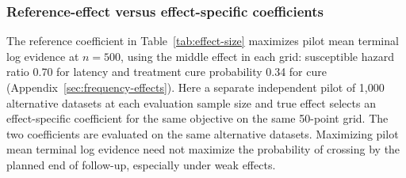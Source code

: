 \documentclass[12pt]{article}
\theoremstyle{definition}
\theoremstyle{remark}
\begin{document}
\subsubsection{Reference-effect versus effect-specific coefficients}
The reference coefficient in Table~\ref{tab:effect-size} maximizes pilot mean terminal log evidence at $n=500$, using the middle effect in each grid: susceptible hazard ratio 0.70 for latency and treatment cure probability 0.34 for cure (Appendix~\ref{sec:frequency-effects}). Here a separate independent pilot of 1,000 alternative datasets at each evaluation sample size and true effect selects an effect-specific coefficient for the same objective on the same 50-point grid. The two coefficients are evaluated on the same alternative datasets. Maximizing pilot mean terminal log evidence need not maximize the probability of crossing by the planned end of follow-up, especially under weak effects.
\clearpage
\begingroup
\scriptsize
\setlength{\tabcolsep}{3pt}
\renewcommand{\arraystretch}{1.00}
\setlength{\LTcapwidth}{\textwidth}
\end{document}
